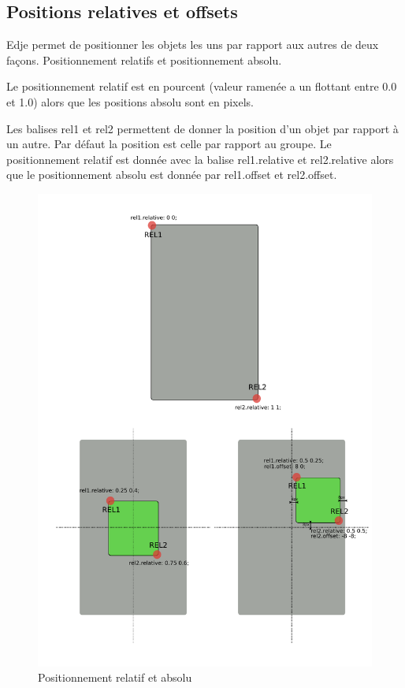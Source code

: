 \documentclass[a4paper]{efr}
\begin{document}
\subsection{Positions relatives et offsets}

Edje permet de positionner les objets les uns par rapport aux autres de deux
façons. Positionnement relatifs et positionnement absolu.

Le positionnement relatif est en pourcent (valeur ramenée a un flottant entre
0.0 et 1.0) alors que les positions absolu sont en pixels.

Les balises rel1 et rel2 permettent de donner la position d'un objet par rapport
à un autre. Par défaut la position est celle par rapport au groupe.
Le positionnement relatif est donnée avec la balise rel1.relative et
rel2.relative alors que le positionnement absolu est donnée par rel1.offset et
rel2.offset.

\begin{figure}
  \begin{center}
    \includegraphics[scale=0.7]{images/rel1rel2.pdf}
  \end{center}
  \caption{Positionnement relatif et absolu}
\end{figure}
\end{document}
